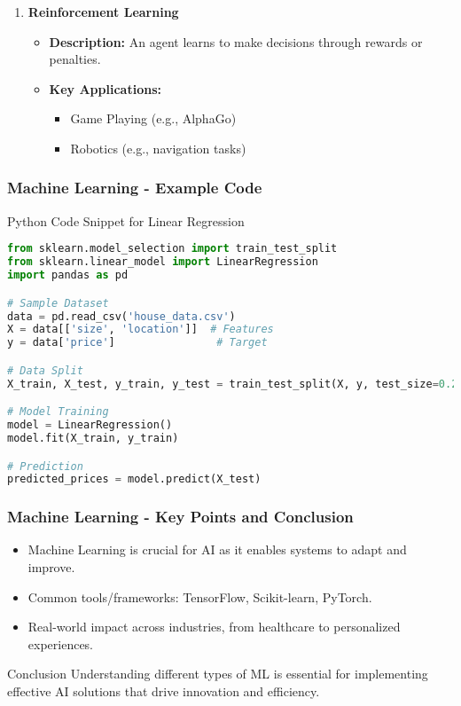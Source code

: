 \documentclass[aspectratio=169]{beamer}
\begin{document}
\begin{frame}
\begin{enumerate}
        \item \textbf{Reinforcement Learning}
            \begin{itemize}
                \item \textbf{Description:} An agent learns to make decisions through rewards or penalties.
                \item \textbf{Key Applications:}
                    \begin{itemize}
                        \item Game Playing (e.g., AlphaGo)
                        \item Robotics (e.g., navigation tasks)
                    \end{itemize}
            \end{itemize}
    \end{enumerate}
\end{frame}

\begin{frame}[fragile]
    \frametitle{Machine Learning - Example Code}
    \begin{block}{Python Code Snippet for Linear Regression}
    \begin{lstlisting}[language=Python]
from sklearn.model_selection import train_test_split
from sklearn.linear_model import LinearRegression
import pandas as pd

# Sample Dataset
data = pd.read_csv('house_data.csv')
X = data[['size', 'location']]  # Features
y = data['price']                # Target

# Data Split
X_train, X_test, y_train, y_test = train_test_split(X, y, test_size=0.2)

# Model Training
model = LinearRegression()
model.fit(X_train, y_train)

# Prediction
predicted_prices = model.predict(X_test)
    \end{lstlisting}
    \end{block}
\end{frame}

\begin{frame}
    \frametitle{Machine Learning - Key Points and Conclusion}
    \begin{itemize}
        \item Machine Learning is crucial for AI as it enables systems to adapt and improve.
        \item Common tools/frameworks: TensorFlow, Scikit-learn, PyTorch.
        \item Real-world impact across industries, from healthcare to personalized experiences.
    \end{itemize}
    \begin{block}{Conclusion}
        Understanding different types of ML is essential for implementing effective AI solutions that drive innovation and efficiency.
    \end{block}
\end{frame}
\end{document}
